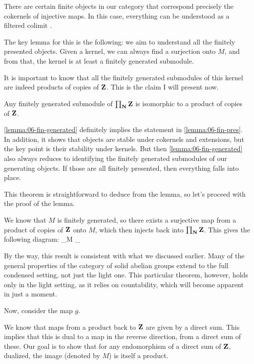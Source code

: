 There are certain finite objects in our category that correspond precisely the cokernels of injective maps. In this case, everything can be understood as a filtered colimit .

The key lemma for this is the following: we aim to understand all the finitely presented objects. Given a kernel, we can always find a surjection onto $M$, and from that, the kernel is at least a finitely generated submodule. 

It is important to know that all the finitely generated submodules of this kernel are indeed products of copies of $\mathbf Z$. This is the claim I will present now.

\bl \label{lemma:06-fin-generated}
Any finitely generated submodule of $\prod_\mathbf N \mathbf Z$ is isomorphic to a product of copies of $\mathbf Z$.
\el

\ref{lemma:06-fin-generated} definitely implies the statement in \ref{lemma:06-fin-pres}. In addition, it shows that objects are stable under cokernels and extensions, but the key point is their stability under kernels.
But then \ref{lemma:06-fin-generated} also always reduces to identifying the finitely generated submodules of our generating objects. If those are all finitely presented, then everything falls into place.

This  theorem is straightforward to deduce from the lemma, so let's proceed with the proof of the lemma.

\bq
We know that $M$ is finitely generated, so there exists a surjective map from a product of copies of $\mathbf Z$ onto $M$, which then injects back into $\prod_\mathbf N \mathbf Z$. This gives the following diagram:
\be
\prod_\N \Z \epi M \mono \prod_\N \Z
\ee

By the way, this result is consistent with what we discussed earlier. Many of the general properties of the category of solid abelian groups extend to the full condensed setting, not just the light one.
This particular theorem, however, holds only in the light setting, as it relies on countability, which will become apparent in just a moment.

Now, consider the map $g$.

We know that maps from a product back to $\mathbf Z$ are given by a direct sum. This implies that this is dual to a map in the reverse direction, from a direct sum of these. 
Our goal is to show that for any endomorphism of a direct sum of $\mathbf Z$, dualized, the image (denoted by $M$) is itself a product.

